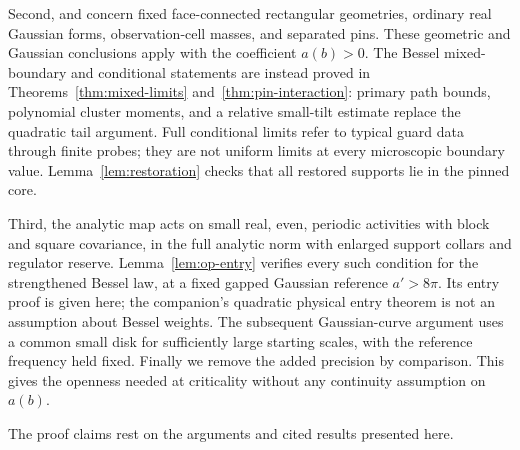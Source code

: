 \documentclass[11pt]{article}
\numberwithin{equation}{section}
\theoremstyle{definition}
\theoremstyle{remark}
\begin{document}
Second,  and 
concern fixed face-connected rectangular geometries, ordinary
real Gaussian forms, observation-cell masses, and separated pins.
These geometric and Gaussian conclusions apply with the
coefficient \(a(b)>0\). The Bessel mixed-boundary and conditional
statements are instead proved in Theorems~\ref{thm:mixed-limits}
and~\ref{thm:pin-interaction}: primary path bounds, polynomial
cluster moments, and a relative small-tilt estimate replace the
quadratic tail argument. Full conditional limits refer to typical
guard data through finite probes; they are not uniform limits at
every microscopic boundary value. Lemma~\ref{lem:restoration}
checks that all restored supports lie in the pinned core.

Third, the analytic map  acts on small real, even,
periodic activities with block and square covariance, in the full
analytic norm with enlarged support collars and regulator
reserve. Lemma~\ref{lem:op-entry} verifies every such condition
for the strengthened Bessel law, at a fixed gapped Gaussian
reference \(a'>8\pi\). Its entry proof is given here; the
companion's quadratic physical entry theorem is not an assumption
about Bessel weights. The subsequent Gaussian-curve argument
uses a common small disk for sufficiently large starting scales,
with the reference frequency held fixed. Finally we remove the
added precision by comparison. This gives the openness needed
at criticality without any continuity assumption on \(a(b)\).






The proof claims rest on the arguments and cited results presented here.

\end{document}
